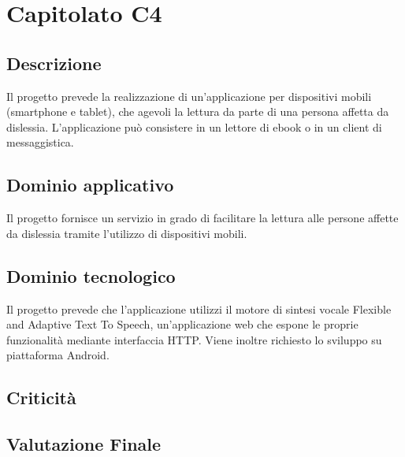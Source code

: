 \section {Capitolato C4}
	\subsection {Descrizione}
	Il progetto prevede la realizzazione di un'applicazione per dispositivi mobili (smartphone e tablet), che agevoli la
lettura da parte di una persona affetta da dislessia.  L'applicazione può consistere in un lettore di ebook o in un
client di messaggistica.
	\subsection {Dominio applicativo}
	Il progetto fornisce un servizio in grado di facilitare la lettura alle persone affette da dislessia tramite l'utilizzo di dispositivi mobili. 
	\subsection {Dominio tecnologico}
Il progetto prevede che l'applicazione utilizzi il motore di sintesi vocale Flexible and Adaptive Text To Speech, un'applicazione web che
espone le proprie funzionalità mediante interfaccia HTTP. Viene inoltre richiesto lo sviluppo su piattaforma Android.
	\subsection {Criticità}
	\subsection {Valutazione Finale}